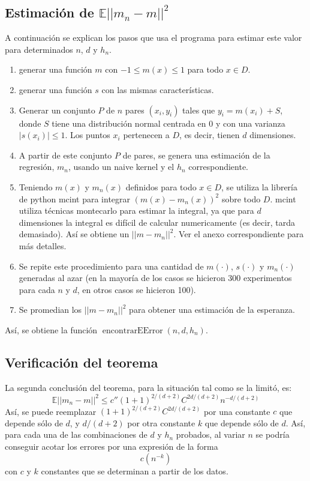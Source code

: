 \documentclass[12pt, a4paper]{article}
\begin{document}
\subsection{Estimación de $\mathds{E}|| m_n-m ||^2$}
A continuación se explican los pasos que usa el programa para estimar este valor para determinados $n$, $d$ y $h_n$.
\begin{enumerate}
  \item generar una función $m$ con $-1 \leq m(x) \leq 1$ para todo $x \in D$. \footnotemark
  \item generar una función $s$ con las mismas características.\footnotemark[\value{footnote}]
  \item Generar un conjunto $P$ de $n$ pares $(x_i,y_i)$ tales que $y_i = m(x_i) + S$, donde $S$ tiene una distribución normal centrada en 0 y con una varianza $|s(x_i)| \leq 1$. Los puntos $x_i$ pertenecen a $D$, es decir, tienen $d$ dimensiones.
  \item A partir de este conjunto $P$ de pares, se genera una estimación de la regresión, $m_n$, usando un naive kernel y el $h_n$ correspondiente.
  \item Teniendo $m(x)$ y $m_n(x)$ definidos para todo $x\in D$, se utiliza la librería de python mcint para integrar $(m(x)-m_n(x))^2$ sobre todo $D$. mcint utiliza técnicas montecarlo para estimar la integral, ya que para $d$ dimensiones la integral es difícil de calcular numericamente (es decir, tarda demasiado). Así se obtiene un $||m-m_n||^2$. Ver el anexo correspondiente para más detalles.
  \item Se repite este procedimiento para una cantidad de $m(\cdot)$, $s(\cdot)$ y $m_n(\cdot)$ generadas al azar (en la mayoría de los casos se hicieron 300 experimentos para cada $n$ y $d$, en otros casos se hicieron 100).
  \item Se promedian los $||m-m_n||^2$ para obtener una estimación de la esperanza.
\end{enumerate}

Así, se obtiene la función $\mathop{encontrarEError}(n,d,h_n)$.

\subsection{Verificación del teorema}
La segunda conclusión del teorema, para la situación tal como se la limitó, es:
$$
\mathds{E}||m_n - m||^2 \leq c'' (1+1)^{2/(d+2)} C^{2d/(d+2)} n^{-d/(d+2)}
$$
Así, se puede reemplazar $(1+1)^{2/(d+2)} C^{2d/(d+2)}$ por una constante $c$ que depende sólo de $d$, y $d/(d+2)$ por otra constante $k$ que depende sólo de $d$. Así, para cada una de las combinaciones de $d$ y $h_n$ probados, al variar $n$ se podría conseguir acotar los errores por una expresión de la forma $$c(n^{-k})$$ con $c$ y $k$ constantes que se determinan a partir de los datos.
\end{document}
